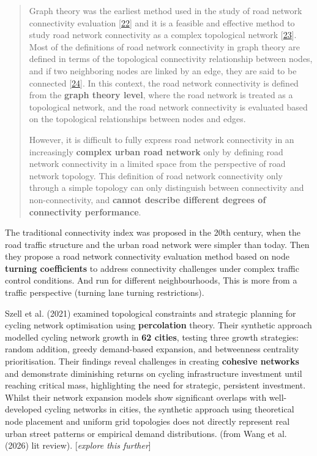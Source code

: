 \documentclass[
  sn-nature,
]{sn-jnl}
\begin{document}
\begin{quote}
Graph theory was the earliest method used in the study of road network
connectivity evaluation
{[}\href{https://onlinelibrary.wiley.com/doi/full/10.1155/atr/3589423\#bib-0022}{22}{]}
and it is a feasible and effective method to study road network
connectivity as a complex topological network
{[}\href{https://onlinelibrary.wiley.com/doi/full/10.1155/atr/3589423\#bib-0023}{23}{]}.
Most of the definitions of road network connectivity in graph theory are
defined in terms of the topological connectivity relationship between
nodes, and if two neighboring nodes are linked by an edge, they are said
to be connected
{[}\href{https://onlinelibrary.wiley.com/doi/full/10.1155/atr/3589423\#bib-0024}{24}{]}.
In this context, the road network connectivity is defined from the
\textbf{graph theory level}, where the road network is treated as a
topological network, and the road network connectivity is evaluated
based on the topological relationships between nodes and edges.

However, it is difficult to fully express road network connectivity in
an increasingly \textbf{complex urban road network} only by defining
road network connectivity in a limited space from the perspective of
road network topology. This definition of road network connectivity only
through a simple topology can only distinguish between connectivity and
non-connectivity, and \textbf{cannot describe different degrees of
connectivity performance}.
\end{quote}

The traditional connectivity index was proposed in the 20th century,
when the road traffic structure and the urban road network were simpler
than today. Then they propose a road network connectivity evaluation
method based on node \textbf{turning coefficients} to address
connectivity challenges under complex traffic control conditions. And
run for different neighbourhoods, This is more from a traffic
perspective (turning lane turning restrictions).

Szell et al. (2021) examined topological constraints and strategic
planning for cycling network optimisation using \textbf{percolation}
theory. Their synthetic approach modelled cycling network growth in
\textbf{62 cities}, testing three growth strategies: random addition,
greedy demand-based expansion, and betweenness centrality
prioritisation. Their findings reveal challenges in creating
\textbf{cohesive networks} and demonstrate diminishing returns on
cycling infrastructure investment until reaching critical mass,
highlighting the need for strategic, persistent investment. Whilst their
network expansion models show significant overlaps with well-developed
cycling networks in cities, the synthetic approach using theoretical
node placement and uniform grid topologies does not directly represent
real urban street patterns or empirical demand distributions. (from Wang
et al. (2026) lit review). {[}\emph{explore this further}{]}
\end{document}
